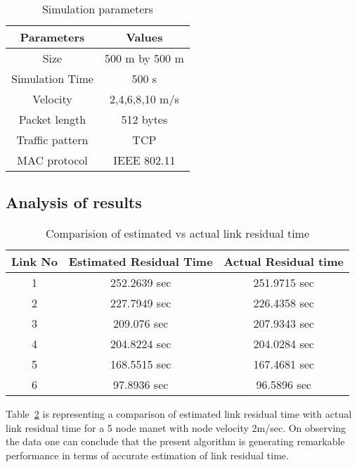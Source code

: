 \documentclass[runningheads]{llncs}
\begin{document}
	
	\begin{table}
		\caption{Simulation parameters}\label{tab1}
		
		
		\begin{center}
			\begin{tabular}{|c c |} 
				\hline
				Parameters & Values \\ [0.5ex] 
				\hline\hline
				Size & 500 m by 500 m  \\ 
				\hline
				Simulation Time & 500 s \\
				\hline
				Velocity & 2,4,6,8,10 m/s \\
				\hline
				Packet length & 512 bytes \\
				\hline
				Traffic pattern & TCP\\ [1ex] 
				\hline
				MAC protocol & IEEE 802.11  \\ [1ex] 
				\hline
				
				
			\end{tabular}
		\end{center}
		
		
	\end{table}
	
	\subsection{Analysis of results}
	\begin{table}
		\caption{Comparision of estimated vs actual link residual time }\label{tab2}                        
		\begin{center}
			\begin{tabular}{|c c c|} 
				\hline
				Link No & Estimated Residual Time & Actual Residual time  \\   
				\hline\hline
				1 & 252.2639 sec  & 251.9715 sec \\ 
				2 & 227.7949 sec  & 226.4358 sec \\
				3 & 209.076 sec & 207.9343  sec \\
				4 & 204.8224 sec & 204.0284 sec \\
				5 & 168.5515 sec & 167.4681 sec \\
				6 & 97.8936 sec & 96.5896 sec  \\  
				\hline                    
			\end{tabular}
			
		\end{center}    
	\end{table}    
	Table~\ref{tab2} is representing a comparison of estimated link residual time with actual link residual time for a 5 node manet with node velocity 2m/sec. On observing the data one can conclude that the present algorithm is generating remarkable performance in terms of accurate estimation of link residual time.
	
\end{document}
